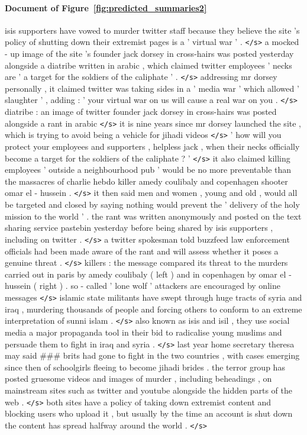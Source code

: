 \documentclass[12pt]{report}
\begin{document}
\begin{appendices}
\paragraph{Document of Figure~\ref{fig:predicted_summaries2}} isis supporters have vowed to murder twitter staff because they believe the site 's policy of shutting down their extremist pages is a ' virtual war ' . \texttt{</s>} a mocked - up image of the site 's founder jack dorsey in cross-hairs was posted yesterday alongside a diatribe written in arabic , which claimed twitter employees ' necks are ' a target for the soldiers of the caliphate ' . \texttt{</s>} addressing mr dorsey personally , it claimed twitter was taking sides in a ' media war ' which allowed ' slaughter ' , adding : ' your virtual war on us will cause a real war on you . \texttt{</s>} diatribe : an image of twitter founder jack dorsey in cross-hairs was posted alongside a rant in arabic \texttt{</s>} it is nine years since mr dorsey launched the site , which is trying to avoid being a vehicle for jihadi videos \texttt{</s>} ' how will you protect your employees and supporters , helpless jack , when their necks officially become a target for the soldiers of the caliphate ? ' \texttt{</s>} it also claimed killing employees ' outside a neighbourhood pub ' would be no more preventable than the massacres of charlie hebdo killer amedy coulibaly and copenhagen shooter omar el - hussein . \texttt{</s>} it then said men and women , young and old , would all be targeted and closed by saying nothing would prevent the ' delivery of the holy mission to the world ' . the rant was written anonymously and posted on the text sharing service pastebin yesterday before being shared by isis supporters , including on twitter . \texttt{</s>} a twitter spokesman told buzzfeed law enforcement officials had been made aware of the rant and will assess whether it poses a genuine threat . \texttt{</s>} killers : the message compared its threat to the murders carried out in paris by amedy coulibaly ( left ) and in copenhagen by omar el - hussein ( right ) . so - called ' lone wolf ' attackers are encouraged by online messages \texttt{</s>} islamic state militants have swept through huge tracts of syria and iraq , murdering thousands of people and forcing others to conform to an extreme interpretation of sunni islam . \texttt{</s>} also known as isis and isil , they use social media a major propaganda tool in their bid to radicalise young muslims and persuade them to fight in iraq and syria . \texttt{</s>} last year home secretary theresa may said \#\#\# brits had gone to fight in the two countries , with cases emerging since then of schoolgirls fleeing to become jihadi brides . the terror group has posted gruesome videos and images of murder , including beheadings , on mainstream sites such as twitter and youtube alongside the hidden parts of the web . \texttt{</s>} both sites have a policy of taking down extremist content and blocking users who upload it , but usually by the time an account is shut down the content has spread halfway around the world . \texttt{</s>}





\end{appendices}
\end{document}
